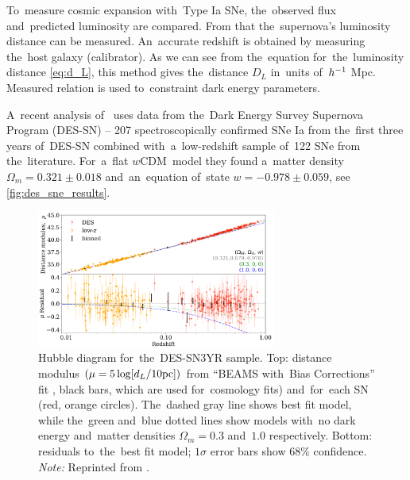 To~measure cosmic expansion with~Type Ia SNe, the~observed flux and~predicted luminosity are compared. From that the~supernova's luminosity distance can be measured. An~accurate redshift is obtained by measuring the~host galaxy (calibrator). As we can see from the~equation for~the~luminosity distance \eqref{eq:d_L}, this method gives the~distance $D_L$ in~units of~$h^{-1}$ Mpc. Measured relation is used to~constraint dark energy parameters.

A~recent analysis of~\textcite{Abbott_2019} uses data from the~Dark Energy Survey Supernova Program (DES-SN) -- 207 spectroscopically confirmed SNe Ia from the~first three years of~DES-SN combined with~a~low-redshift sample of~122 SNe from the~literature. For~a~flat $w$CDM\ model they found a~matter density $\Omega_m=0.321\pm0.018$ and~an~equation of~state $w=-0.978\pm0.059$, see \autoref{fig:des_sne_results}.

\begin{figure}[hbt]
    \centering
    \includegraphics[width=0.7\textwidth]{cosmo_evol/DES_SNe_results.png}
    \caption{Hubble diagram for~the~DES-SN3YR sample. Top: distance modulus $(\mu =5\log [d_L/10\rm{pc}])$ from ``BEAMS with~Bias Corrections'' fit \parencite{Kessler_2017}, black bars, which are used for~cosmology fits) and~for~each SN (red, orange circles). The~dashed gray line shows best fit model, while the~green and~blue dotted lines show models with~no dark energy and~matter densities $\Omega_m = 0.3$ and~$1.0$ respectively. Bottom: residuals to~the~best fit model; $1\sigma$ error bars show 68\% confidence. \textit{Note:} Reprinted from \textcite{Abbott_2019}.}
    \label{fig:des_sne_results}
\end{figure}
